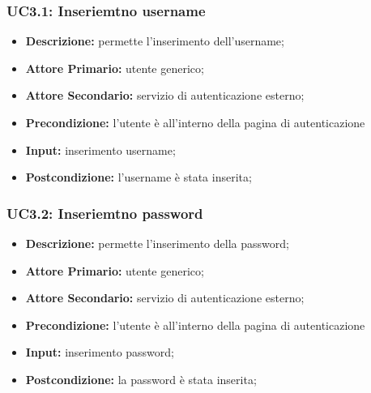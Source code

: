 \subsubsection{UC3.1: Inseriemtno username}
\begin{itemize}
    \item \textbf{Descrizione:} permette l'inserimento dell'username;
    \item \textbf{Attore Primario:} utente generico;
    \item \textbf{Attore Secondario:} servizio di autenticazione esterno;
    \item \textbf{Precondizione:} l'utente è all'interno della pagina di autenticazione
    \item \textbf{Input:} inserimento username;
    \item \textbf{Postcondizione:} l'username è stata inserita;
\end{itemize}
\subsubsection{UC3.2: Inseriemtno password}
\begin{itemize}
    \item \textbf{Descrizione:} permette l'inserimento della password;
    \item \textbf{Attore Primario:} utente generico;
    \item \textbf{Attore Secondario:} servizio di autenticazione esterno;
    \item \textbf{Precondizione:} l'utente è all'interno della pagina di autenticazione
    \item \textbf{Input:} inserimento password;
    \item \textbf{Postcondizione:} la password è stata inserita;
\end{itemize}
